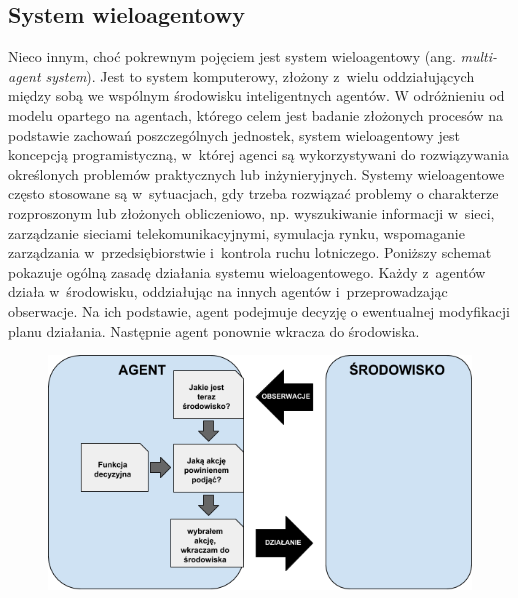 \subsection{System wieloagentowy}
    Nieco innym, choć pokrewnym pojęciem jest system wieloagentowy (ang. \textit{multi-agent system}). Jest to system komputerowy, złożony z~wielu oddziałujących między sobą we wspólnym środowisku inteligentnych agentów. W odróżnieniu od modelu opartego na agentach, którego celem jest badanie złożonych procesów na podstawie zachowań poszczególnych jednostek, system wieloagentowy jest koncepcją programistyczną, w~której agenci są wykorzystywani do rozwiązywania określonych problemów praktycznych lub inżynieryjnych. Systemy wieloagentowe często stosowane są w~sytuacjach, gdy trzeba rozwiązać problemy o charakterze rozproszonym lub złożonych obliczeniowo, np. wyszukiwanie informacji w~sieci, zarządzanie sieciami telekomunikacyjnymi, symulacja rynku, wspomaganie zarządzania w~przedsiębiorstwie i~kontrola ruchu lotniczego\cite{wiki-agent}. Poniższy schemat pokazuje ogólną zasadę działania systemu wieloagentowego. Każdy z~agentów działa w~środowisku, oddziałując na innych agentów i~przeprowadzając obserwacje. Na ich podstawie, agent podejmuje decyzję o ewentualnej modyfikacji planu działania. Następnie agent ponownie wkracza do środowiska.
    \begin{figure}[h]
        \includegraphics[width=\textwidth]{images/mopsim/multi-agent.png}
    \end{figure}
